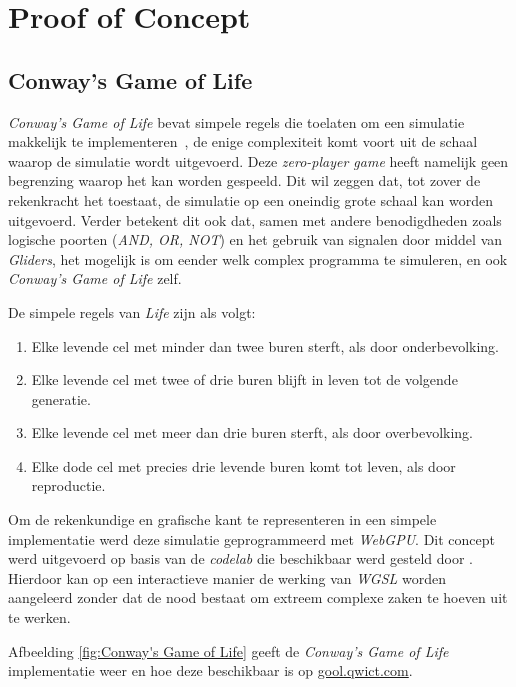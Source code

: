 \chapter{Proof of Concept}
\label{ch:poc}

\section{Conway's Game of Life}
\label{sec:gool}

\textit{Conway's Game of Life} bevat simpele regels die toelaten om een simulatie makkelijk te implementeren~\autocite{Gardner1970}, de enige complexiteit komt voort uit de schaal waarop de simulatie wordt uitgevoerd. Deze \textit{zero-player game} heeft namelijk geen begrenzing waarop het kan worden gespeeld. Dit wil zeggen dat, tot zover de rekenkracht het toestaat, de simulatie op een oneindig grote schaal kan worden uitgevoerd. Verder betekent dit ook dat, samen met andere benodigdheden zoals logische poorten (\textit{AND, OR, NOT}) en het gebruik van signalen door middel van \textit{Gliders}, het mogelijk is om eender welk complex programma te simuleren, en ook \textit{Conway's Game of Life} zelf.

\bigbreak{}

De simpele regels van \textit{Life} zijn als volgt:
\begin{enumerate}
    \item Elke levende cel met minder dan twee buren sterft, als door onderbevolking.
    \item Elke levende cel met twee of drie buren blijft in leven tot de volgende generatie.
    \item Elke levende cel met meer dan drie buren sterft, als door overbevolking.
    \item Elke dode cel met precies drie levende buren komt tot leven, als door reproductie.
\end{enumerate}

\break{}

Om de rekenkundige en grafische kant te representeren in een simpele implementatie werd deze simulatie geprogrammeerd met \textit{WebGPU}. Dit concept werd uitgevoerd op basis van de \textit{codelab} die beschikbaar werd gesteld door \textcite{google2023}. Hierdoor kan op een interactieve manier de werking van \textit{WGSL} worden aangeleerd zonder dat de nood bestaat om extreem complexe zaken te hoeven uit te werken.

\bigbreak{}

Afbeelding \ref{fig:Conway's Game of Life} geeft de \textit{Conway's Game of Life} implementatie weer en hoe deze beschikbaar is op \href{https://gool.qwict.com}{gool.qwict.com}.

